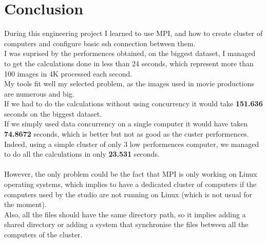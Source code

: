 \section{Conclusion}
During this engineering project I learned to use MPI, and how to create cluster of computers and configure basic ssh connection between them.\\
I was suprised by the performences obtained, on the biggest dataset, I managed to get the calculations done in less than 24 seconds, which represent more than 100 images in 4K processed each second.\\
My tools fit well my selected problem, as the images used in movie productions are numerous and big.\\
If we had to do the calculations without using concurrency it would take \textbf{151.636} seconds on the biggest dataset.\\
If we simply used data concurrency on a single computer it would have taken \textbf{74.8672} seconds, which is better but not as good as the custer performences.\\
Indeed, using a simple cluster of only 3 low performences computer, we managed to do all the calculations in only \textbf{23.531} seconds.\\
\\
However, the only problem could be the fact that MPI is only working on Linux operating systems, which implies to have a dedicated cluster of computers if the computers used by the studio are not running on Linux (which is not usual for the moment).\\
Also, all the files should have the same directory path, so it implies adding a shared directory or adding a system that synchronise the files between all the computers of the cluster.
